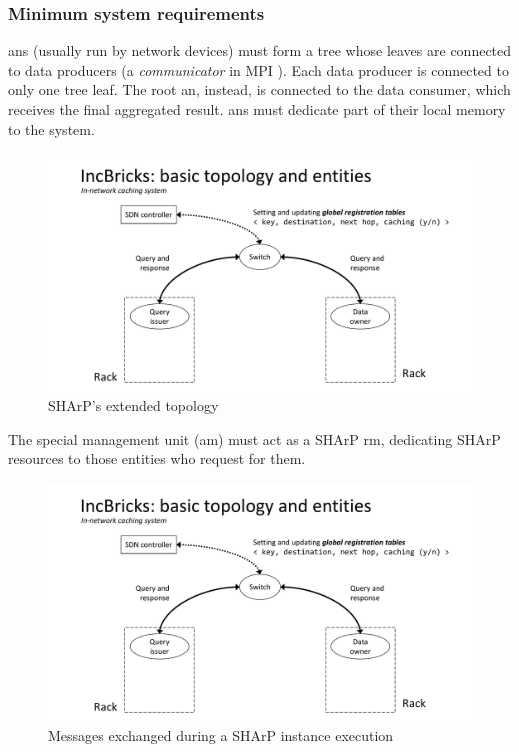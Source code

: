 \subsubsection{Minimum system requirements}
\glspl{an} (usually run by network devices) must form a tree whose leaves are connected to data producers (a \textit{communicator} in MPI \cite{mpi}).
Each data producer is connected to only one tree leaf.
The root \gls{an}, instead, is connected to the data consumer, which receives the final aggregated result.
\glspl{an} must dedicate part of their local memory to the system.

\begin{figure}[!htb]
    \centering
        \includegraphics[page=14, clip, trim=2.4cm 0.7cm 1.8cm 3.6cm, width=1.00\textwidth]{figures/analysis/inp/presentation.pdf}
    \caption{SHArP's \texorpdfstring{\cite{sharp}}{} extended topology}
\end{figure}

The special management unit (\gls{am}) must act as a SHArP \cite{sharp} \gls{rm}, dedicating SHArP \cite{sharp} resources to those entities who request for them.

\begin{figure}[!htb]
    \centering
        \includegraphics[page=16, clip, trim=3.6cm 0.3cm 3.7cm 0.2cm, width=1.00\textwidth]{figures/analysis/inp/presentation.pdf}
    \caption{Messages exchanged during a SHArP \texorpdfstring{\cite{sharp}}{} instance execution}
\end{figure}

